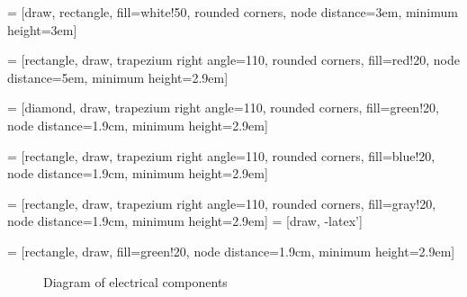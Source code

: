  = [draw, rectangle, fill=white!50, rounded corners, node distance=3em, minimum height=3em]

 = [rectangle, draw, trapezium right angle=110, rounded corners,
                  fill=red!20, node distance=5em, minimum height=2.9em]

 = [diamond, draw, trapezium right angle=110, rounded corners,
                  fill=green!20, node distance=1.9cm, minimum height=2.9em]

 = [rectangle, draw, trapezium right angle=110, rounded corners,
                  fill=blue!20, node distance=1.9cm, minimum height=2.9em]

 = [rectangle, draw, trapezium right angle=110, rounded corners,
                  fill=gray!20, node distance=1.9cm, minimum height=2.9em]
 = [draw, -latex']

 = [rectangle, draw, fill=green!20, node distance=1.9cm, minimum height=2.9em]

    
    \begin{figure}
        \begin{center}
\end{center}
\caption{Diagram of electrical components}
\label{fig:electrical_components}
\end{figure}

